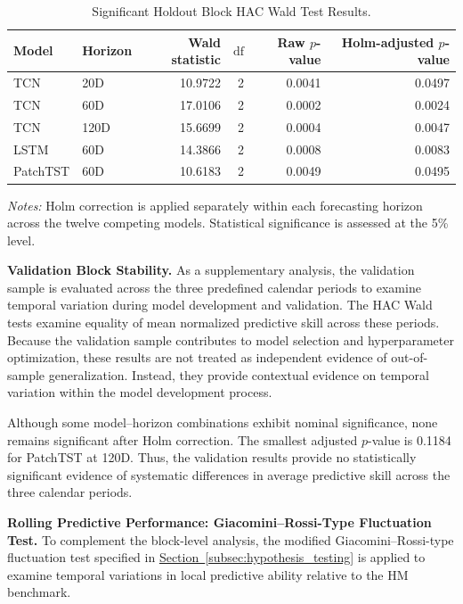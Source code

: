 \documentclass[runningheads,orivec]{llncs}
\begin{document}
\begin{table}[htbp]
\centering
\caption{Significant Holdout Block HAC Wald Test Results.}\label{tab:h3_holdout_sig}
\setlength{\tabcolsep}{4.5pt}
\begin{tabular}{llrrrr}
\hline
Model & Horizon & Wald statistic & $\mathrm{df}$ & Raw $p$-value & Holm-adjusted $p$-value \\
\hline
TCN & 20D & 10.9722 & 2 & 0.0041 & 0.0497 \\
TCN & 60D & 17.0106 & 2 & 0.0002 & 0.0024 \\
TCN & 120D & 15.6699 & 2 & 0.0004 & 0.0047 \\
LSTM & 60D & 14.3866 & 2 & 0.0008 & 0.0083 \\
PatchTST & 60D & 10.6183 & 2 & 0.0049 & 0.0495 \\
\hline
\end{tabular}
\par\vspace{4pt}\parbox{\linewidth}{\scriptsize\textit{Notes:} Holm correction is applied separately within each forecasting horizon across the twelve competing models. Statistical significance is assessed at the 5\% level.}
\end{table}

\noindent\textbf{Validation Block Stability.}
As a supplementary analysis, the validation sample is evaluated across the three predefined calendar periods to examine temporal variation during model development and validation. The HAC Wald tests examine equality of mean normalized predictive skill across these periods. Because the validation sample contributes to model selection and hyperparameter optimization, these results are not treated as independent evidence of out-of-sample generalization. Instead, they provide contextual evidence on temporal variation within the model development process.

Although some model--horizon combinations exhibit nominal significance, none remains significant after Holm correction. The smallest adjusted $p$-value is 0.1184 for PatchTST at 120D. Thus, the validation results provide no statistically significant evidence of systematic differences in average predictive skill across the three calendar periods.

\medskip
\noindent\textbf{Rolling Predictive Performance: Giacomini--Rossi-Type Fluctuation Test.}
To complement the block-level analysis, the modified Giacomini--Rossi-type fluctuation test specified in \hyperref[subsec:hypothesis_testing]{Section~\ref*{subsec:hypothesis_testing}} is applied to examine temporal variations in local predictive ability relative to the HM benchmark.
\end{document}
